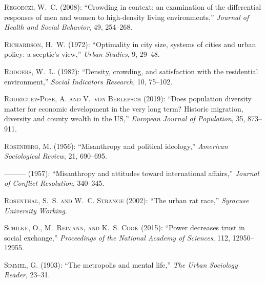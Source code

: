 \documentclass[11pt, letterpaper]{article}
\begin{document}
\begin{spacing}{1.4}
\begin{thebibliography}{92}
\textsc{Regoeczi, W.~C.} (2008): \enquote{Crowding in context: an examination
  of the differential responses of men and women to high-density living
  environments,} \emph{Journal of Health and Social Behavior}, 49, 254--268.

\textsc{Richardson, H.~W.} (1972): \enquote{Optimality in city size, systems of
  cities and urban policy: a sceptic's view,} \emph{Urban Studies}, 9, 29--48.

\textsc{Rodgers, W.~L.} (1982): \enquote{Density, crowding, and satisfaction
  with the residential environment,} \emph{Social Indicators Research}, 10,
  75--102.

\textsc{Rodr{\'\i}guez-Pose, A. and V.~von Berlepsch} (2019): \enquote{Does
  population diversity matter for economic development in the very long term?
  Historic migration, diversity and county wealth in the US,} \emph{European
  Journal of Population}, 35, 873--911.

\textsc{Rosenberg, M.} (1956): \enquote{Misanthropy and political ideology,}
  \emph{American Sociological Review}, 21, 690--695.

---\hspace{-.1pt}---\hspace{-.1pt}--- (1957): \enquote{Misanthropy and
  attitudes toward international affairs,} \emph{Journal of Conflict
  Resolution}, 340--345.

\textsc{Rosenthal, S.~S. and W.~C. Strange} (2002): \enquote{The urban rat
  race,} \emph{Syracuse University Working}.

\textsc{Schilke, O., M.~Reimann, and K.~S. Cook} (2015): \enquote{Power
  decreases trust in social exchange,} \emph{Proceedings of the National
  Academy of Sciences}, 112, 12950--12955.

\textsc{Simmel, G.} (1903): \enquote{The metropolis and mental life,} \emph{The
  Urban Sociology Reader}, 23--31.


\end{thebibliography}
\end{spacing}
\end{document}
